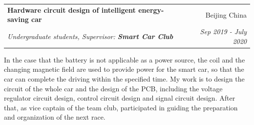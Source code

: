 \documentclass[letterpaper,10pt]{article}
\makeatletter
\newcommand{\resumeItem}[2]{
  \item\small{
    \textbf{#1}{: #2 \vspace{-2pt}}
  }
}
\newcommand{\resumeSubheading}[4]{
  \vspace{-1pt}\item[]
  \begin{tabular*}{0.98\textwidth}{l@{\extracolsep{\fill}}r}
      \hspace{-10pt}\textbf{#1} & #2 \\
      \hspace{-10pt}\textit{\small#3} & \textit{\small #4} \\
    \end{tabular*}\vspace{-5pt}
}
\newcommand{\resumeItemListStart}{\begin{itemize}}
\newcommand{\resumeItemListEnd}{\end{itemize}\vspace{-5pt}}
\makeatother
\begin{document}
 		\resumeSubheading
 		{Hardware circuit design of intelligent energy-saving car}{Beijing China}
 		{Undergraduate students, Supervisor: \textbf{Smart Car Club}}{Sep 2019 - July 2020}
 		
 		{In the case that the battery is not applicable as a power source, the coil and the changing magnetic field are used to provide power for the smart car, so that the car can complete the driving within the specified time. My work is to design the circuit of the whole car and the design of the PCB, including the voltage regulator circuit design, control circuit design and signal circuit design. After that, as vice captain of the team club, participated in guiding the preparation and organization of the next race.}
  
%
%
\end{document}
